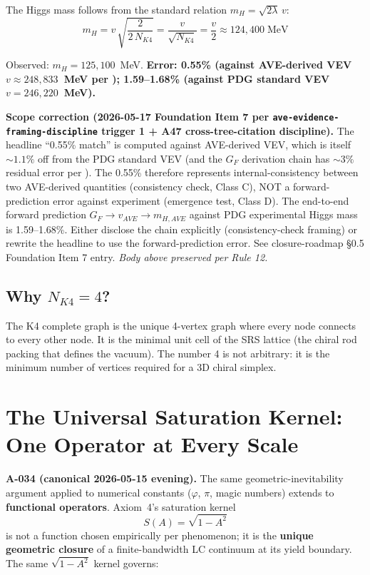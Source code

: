 The Higgs mass follows from the standard relation $m_H = \sqrt{2\lambda}\,v$:
\begin{equation}
    m_H = v\,\sqrt{\frac{2}{2\,N_{K4}}} = \frac{v}{\sqrt{N_{K4}}}
    = \frac{v}{2} \approx 124{,}400\;\text{MeV}
\end{equation}

Observed: $m_H = 125{,}100$~MeV.  \textbf{Error: 0.55\% (against AVE-derived VEV $v \approx 248{,}833$~MeV per ); 1.59--1.68\% (against PDG standard VEV $v = 246{,}220$~MeV).}

\textbf{Scope correction (2026-05-17 Foundation Item 7 per \texttt{ave-evidence-framing-discipline} trigger 1 + A47 cross-tree-citation discipline).} The headline ``0.55\% match'' is computed against AVE-derived VEV, which is itself $\sim 1.1\%$ off from the PDG standard VEV (and the $G_F$ derivation chain has $\sim 3\%$ residual error per ). The 0.55\% therefore represents internal-consistency between two AVE-derived quantities (consistency check, Class C), NOT a forward-prediction error against experiment (emergence test, Class D). The end-to-end forward prediction $G_F \to v_{AVE} \to m_{H,AVE}$ against PDG experimental Higgs mass is 1.59--1.68\%. Either disclose the chain explicitly (consistency-check framing) or rewrite the headline to use the forward-prediction error. See closure-roadmap \S0.5 Foundation Item 7 entry. \textit{Body above preserved per Rule 12.}

\subsection{Why $N_{K4} = 4$?}

The K4 complete graph is the unique 4-vertex graph where every
node connects to every other node.  It is the minimal unit cell
of the SRS lattice (the chiral rod packing that defines the vacuum).
The number 4 is not arbitrary: it is the minimum number of vertices
required for a 3D chiral simplex.


\section{The Universal Saturation Kernel: One Operator at Every Scale}
\label{sec:a034_in_geometric_inevitability}

\noindent \textbf{A-034 (canonical 2026-05-15 evening).} The same geometric-inevitability argument applied to numerical constants ($\varphi$, $\pi$, magic numbers) extends to \textbf{functional operators}. Axiom~4's saturation kernel
\begin{equation}
S(A) = \sqrt{1 - A^2}
\end{equation}
is not a function chosen empirically per phenomenon; it is the \textbf{unique geometric closure} of a finite-bandwidth LC continuum at its yield boundary. The same $\sqrt{1 - A^2}$ kernel governs:

